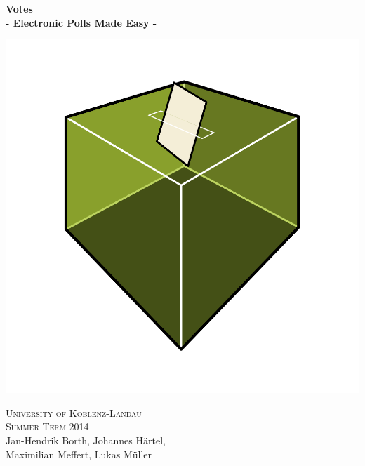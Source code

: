 \documentclass[a4paper]{article}
\begin{document}
\begin{titlepage}

\centering


{\Huge\fontsize{40}{40} \textbf{Votes}}
\\ \vspace*{7mm}
{\LARGE \textbf{- Electronic Polls Made Easy -}}
\\ \vspace*{3mm}

\includegraphics[width=\textwidth]{votes.png}

{\huge \textsc{University of Koblenz-Landau}}
\\ \vspace*{3mm}
{\Large \textsc{Summer Term 2014}}
\\ \vspace*{7mm}
{\large
Jan-Hendrik Borth,
Johannes Härtel,\\
Maximilian Meffert, 
Lukas Müller 
}

\end{titlepage}

\newpage
\vspace*{\fill}
\newpage

\newpage
\tableofcontents
\newpage
\listoffigures
\newpage



\appendix

%

{
	\footnotesize
	
	
}
\end{document}
